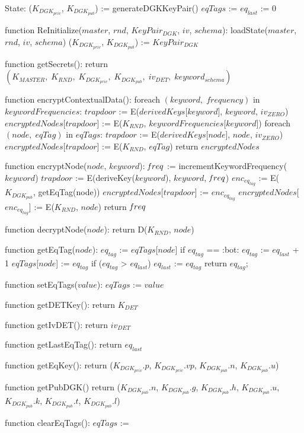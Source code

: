 State:
    ($K_{DGK_{priv}}$, $K_{DGK_{pub}}$) := generateDGKKeyPair()
    $eqTags$ := {}
    $eq_{last}$ := 0

function ReInitialize($master$, $rnd$, $KeyPair_{DGK}$, $iv$, $schema$):
    loadState($master$, $rnd$, $iv$, $schema$)
    ($K_{DGK_{priv}}$, $K_{DGK_{pub}}$) := $KeyPair_{DGK}$

function getSecrets():
    return $(K_{MASTER}, \; K_{RND}, \; K_{DGK_{priv}}, \; K_{DGK_{pub}}, \; iv_{DET}, \; keyword_{schema})$

function encryptContextualData():
    foreach $(keyword, \; frequency)$ in $keywordFrequencies$:
        $trapdoor$ := E($derivedKeys$[$keyword$], $keyword$, $iv_{ZERO}$)
        $encryptedNodes$[$trapdoor$] := E($K_{RND}$, $keywordFrequencies$[$keyword$])
    foreach $(node, \; eqTag)$ in $eqTags$:
        $trapdoor$ := E($derivedKeys$[$node$], $node$, $iv_{ZERO}$)
        $encryptedNodes$[$trapdoor$] := E($K_{RND}$, $eqTag$)
    return $encryptedNodes$
        
function encryptNode($node$, $keyword$):
    $\textrm{\emph{f}}req$ := incrementKeywordFrequency($keyword$)
    $trapdoor$ := E(deriveKey($keyword$), $keyword$, $\textrm{\emph{f}}req$)
    $enc_{eq_{tag}}$ := E($K_{DGK_{pub}}$, getEqTag(node))
    $encryptedNodes$[$trapdoor$] := $enc_{eq_{tag}}$
    $encryptedNodes$[$enc_{eq_{tag}}$] := E($K_{RND}$, $node$)
    return $\textrm{\emph{f}}req$

function decryptNode($node$):
    return D($K_{RND}$, $node$)

function getEqTag($node$):
    $eq_{tag}$ := $eqTags$[$node$]
    if $eq_{tag}$ == :bot:
        $eq_{tag}$ := $eq_{last}$ + 1
        $eqTags$[$node$] := $eq_{tag}$
    if ($eq_{tag}$ > $eq_{last}$)
        $eq_{last}$ := $eq_{tag}$
    return $eq_{tag}$;
    
function setEqTags($value$):
    $eqTags$ := $value$

function getDETKey():
    return $K_{DET}$

function getIvDET():
    return $iv_{DET}$

function getLastEqTag():
    return $eq_{last}$

function getEqKey():
    return ($K_{DGK_{priv}}.p$, $K_{DGK_{priv}}.vp$, $K_{DGK_{pub}}.n$, $K_{DGK_{pub}}.u$)

function getPubDGK()
    return ($K_{DGK_{pub}}.n$, $K_{DGK_{pub}}.g$, $K_{DGK_{pub}}.h$, $K_{DGK_{pub}}.u$, $K_{DGK_{pub}}.k$, $K_{DGK_{pub}}.t$, $K_{DGK_{pub}}.l$)

function clearEqTags():
    $eqTags$ := {}

